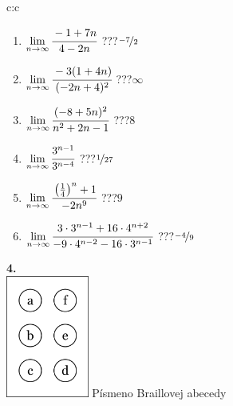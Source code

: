 \documentclass[10pt]{report}
\begin{document}
\begin{tabular}{c:c}
\begin{minipage}[c][104.5mm][t]{0.5\linewidth}
\begin{center}
\begin{minipage}{0.79\linewidth}
\begin{center}
\begin{varwidth}{\linewidth}
\begin{enumerate}
\normalsize
\item $\lim\limits_{n\to\infty}\cfrac{-1+7n}{4-2n}$\quad \dotfill\; ???\;\dotfill \quad $\nicefrac{-7}{2}$
\item $\lim\limits_{n\to\infty}\cfrac{-3(1+4n)}{(-2n+4)^2}$\quad \dotfill\; ???\;\dotfill \quad $\infty$
\item $\lim\limits_{n\to\infty}\cfrac{(-8+5n)^2}{n^2+2n-1}$\quad \dotfill\; ???\;\dotfill \quad $8$
\item $\lim\limits_{n\to\infty}\cfrac{3^{n-1}}{3^{n-4}}$\quad \dotfill\; ???\;\dotfill \quad $\nicefrac{1}{27}$
\item $\lim\limits_{n\to\infty}\cfrac{\left(\frac{1}{4}\right)^n +1}{-2n^{9}}$\quad \dotfill\; ???\;\dotfill \quad $9$
\item $\lim\limits_{n\to\infty}\cfrac{3\cdot 3^{n-1}+16\cdot 4^{n+2}}{-9\cdot 4^{n-2}-16\cdot 3^{n-1}}$\quad \dotfill\; ???\;\dotfill \quad $\nicefrac{-4}{9}$
\end{enumerate}
\end{varwidth}
\end{center}
\end{minipage}
\begin{minipage}{0.20\linewidth}
\begin{center}
{\Huge\bfseries 4.} \\[2mm]
\includegraphics[height=40mm]{../images/braille.png}
{\small Písmeno Braillovej abecedy}
\end{center}
\end{minipage}
\end{center}
\end{minipage}
%
\end{tabular}
\newpage
\thispagestyle{empty}
\end{document}
